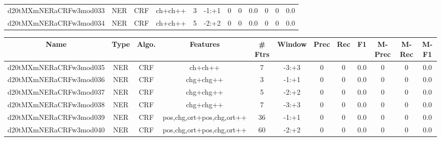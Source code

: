 \documentclass[a4paper]{article}
\begin{document}
\begin{landscape}
\begin{center}
\begin{tabular}{ |c|c|c|c|c|c|c|c|c|c|c|c|}
 
 	
 	\small{ d20tMXmNERaCRFw3mod033 } & \small{ NER} & \small{  CRF }  & ch+ch++  &  3 &  \small{  -1:+1 }  &  0 & 0 & 0.0  &  0 & 0 & 0.0 \\
 	

 
 	
 	\small{ d20tMXmNERaCRFw3mod034 } & \small{ NER} & \small{  CRF }  & ch+ch++  &  5 &  \small{  -2:+2 }  &  0 & 0 & 0.0  &  0 & 0 & 0.0 \\
 	
 \hline
\end{tabular}
\end{center}




\begin{center}
\begin{tabular}{ |c|c|c|c|c|c|c|c|c|c|c|c|} 
 \hline
 	Name & Type & Algo. & Features & \# Ftrs & Window & Prec & Rec & F1 & M-Prec & M-Rec & M-F1\\
 \hline

 	

 
 	
 	\small{ d20tMXmNERaCRFw3mod035 } & \small{ NER} & \small{  CRF }  & ch+ch++  &  7 &  \small{  -3:+3 }  &  0 & 0 & 0.0  &  0 & 0 & 0.0 \\
 	

 
 	
 	\small{ d20tMXmNERaCRFw3mod036 } & \small{ NER} & \small{  CRF }  & chg+chg++  &  3 &  \small{  -1:+1 }  &  0 & 0 & 0.0  &  0 & 0 & 0.0 \\
 	

 
 	
 	\small{ d20tMXmNERaCRFw3mod037 } & \small{ NER} & \small{  CRF }  & chg+chg++  &  5 &  \small{  -2:+2 }  &  0 & 0 & 0.0  &  0 & 0 & 0.0 \\
 	

 
 	
 	\small{ d20tMXmNERaCRFw3mod038 } & \small{ NER} & \small{  CRF }  & chg+chg++  &  7 &  \small{  -3:+3 }  &  0 & 0 & 0.0  &  0 & 0 & 0.0 \\
 	

 
 	
 	\small{ d20tMXmNERaCRFw3mod039 } & \small{ NER} & \small{  CRF }  & pos,chg,ort+pos,chg,ort++  &  36 &  \small{  -1:+1 }  &  0 & 0 & 0.0  &  0 & 0 & 0.0 \\
 	

 
 	
 	\small{ d20tMXmNERaCRFw3mod040 } & \small{ NER} & \small{  CRF }  & pos,chg,ort+pos,chg,ort++  &  60 &  \small{  -2:+2 }  &  0 & 0 & 0.0  &  0 & 0 & 0.0 \\
 	


\end{tabular}
\end{center}
\end{landscape}
\end{document}
